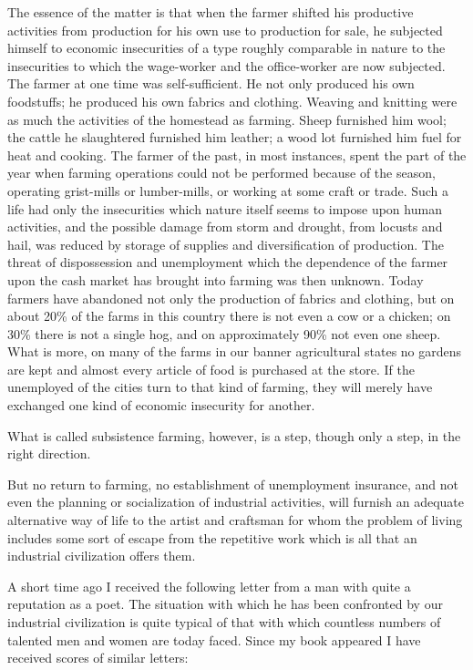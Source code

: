 \documentclass{book}
\begin{document}
The essence of the matter is that when the farmer shifted his productive activities from production for his own use to production for sale, he subjected himself to economic insecurities of a type roughly comparable in nature to the insecurities to which the wage-worker and the office-worker are now subjected. The farmer at one time was self-sufficient. He not only produced his own foodstuffs; he produced his own fabrics and clothing. Weaving and knitting were as much the activities of the homestead as farming. Sheep furnished him wool; the cattle he slaughtered furnished him leather; a wood lot furnished him fuel for heat and cooking. The farmer of the past, in most instances, spent the part of the year when farming operations could not be performed because of the season, operating grist-mills or lumber-mills, or working at some craft or trade. Such a life had only the insecurities which nature itself seems to impose upon human activities, and the possible damage from storm and drought, from locusts and hail, was reduced by storage of supplies and diversification of production. The threat of dispossession and unemployment which the dependence of the farmer upon the cash market has brought into farming was then unknown. Today farmers have abandoned not only the production of fabrics and clothing, but on about 20\% of the farms in this country there is not even a cow or a chicken; on 30\% there is not a single hog, and on approximately 90\% not even one sheep. What is more, on many of the farms in our banner agricultural states no gardens are kept and almost every article of food is purchased at the store. If the unemployed of the cities turn to that kind of farming, they will merely have exchanged one kind of economic insecurity for another.

What is called subsistence farming, however, is a step, though only a step, in the right direction.

But no return to farming, no establishment of unemployment insurance, and not even the planning or socialization of industrial activities, will furnish an adequate alternative way of life to the artist and craftsman for whom the problem of living includes some sort of escape from the repetitive work which is all that an industrial civilization offers them.

A short time ago I received the following letter from a man with quite a reputation as a poet. The situation with which he has been confronted by our industrial civilization is quite typical of that with which countless numbers of talented men and women are today faced. Since my book appeared I have received scores of similar letters:
\end{document}
